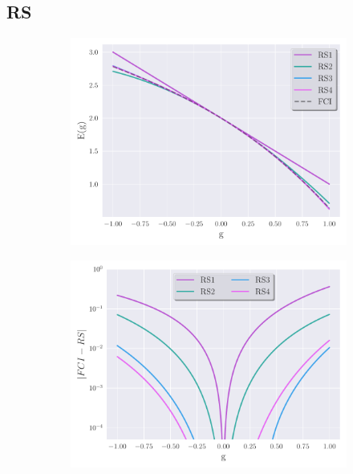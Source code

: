 \documentclass[
11pt,notheorems,hyperref={pdfauthor=whatever}
]{beamer}
\begin{document}
\subsection{RS}
\begin{frame}
    \begin{figure}
        \begin{subfigure}{.49\textwidth}
            \includegraphics[width=\linewidth]{figs/RS_E.pdf}
        \end{subfigure}
        \hfill
        \begin{subfigure}{.49\textwidth}
            \centering
            \includegraphics[width=\linewidth]{figs/RS_diff.pdf}
        \end{subfigure}
    \end{figure}
\end{frame}
\end{document}
